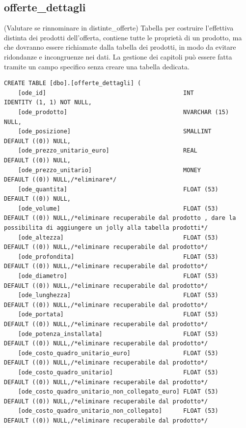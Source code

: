 \documentclass[12pt]{article}
\begin{document}
\subsection{offerte\_dettagli}(Valutare se rinnominare in distinte\_offerte)
Tabella per costruire l'effettiva distinta dei prodotti dell'offerta, contiene tutte le proprietà di un prodotto,
ma che dovranno essere richiamate dalla tabella dei prodotti,
in modo da evitare ridondanze e incongruenze nei dati.
La gestione dei capitoli può essere fatta tramite un campo specifico senza creare una tabella dedicata.
\begin{lstlisting}
CREATE TABLE [dbo].[offerte_dettagli] (
    [ode_id]                                       INT            IDENTITY (1, 1) NOT NULL,
    [ode_prodotto]                                 NVARCHAR (15)  NULL,
    [ode_posizione]                                SMALLINT       DEFAULT ((0)) NULL,
    [ode_prezzo_unitario_euro]                     REAL           DEFAULT ((0)) NULL,
    [ode_prezzo_unitario]                          MONEY          DEFAULT ((0)) NULL,/*eliminare*/
    [ode_quantita]                                 FLOAT (53)     DEFAULT ((0)) NULL,
    [ode_volume]                                   FLOAT (53)     DEFAULT ((0)) NULL,/*eliminare recuperabile dal prodotto , dare la possibilita di aggiungere un jolly alla tabella prodotti*/
    [ode_altezza]                                  FLOAT (53)     DEFAULT ((0)) NULL,/*eliminare recuperabile dal prodotto*/
    [ode_profondita]                               FLOAT (53)     DEFAULT ((0)) NULL,/*eliminare recuperabile dal prodotto*/
    [ode_diametro]                                 FLOAT (53)     DEFAULT ((0)) NULL,/*eliminare recuperabile dal prodotto*/
    [ode_lunghezza]                                FLOAT (53)     DEFAULT ((0)) NULL,/*eliminare recuperabile dal prodotto*/
    [ode_portata]                                  FLOAT (53)     DEFAULT ((0)) NULL,/*eliminare recuperabile dal prodotto*/
    [ode_potenza_installata]                       FLOAT (53)     DEFAULT ((0)) NULL,/*eliminare recuperabile dal prodotto*/
    [ode_costo_quadro_unitario_euro]               FLOAT (53)     DEFAULT ((0)) NULL,/*eliminare recuperabile dal prodotto*/
    [ode_costo_quadro_unitario]                    FLOAT (53)     DEFAULT ((0)) NULL,/*eliminare recuperabile dal prodotto*/
    [ode_costo_quadro_unitario_non_collegato_euro] FLOAT (53)     DEFAULT ((0)) NULL,/*eliminare recuperabile dal prodotto*/
    [ode_costo_quadro_unitario_non_collegato]      FLOAT (53)     DEFAULT ((0)) NULL,/*eliminare recuperabile dal prodotto*/

\end{lstlisting}
\end{document}
